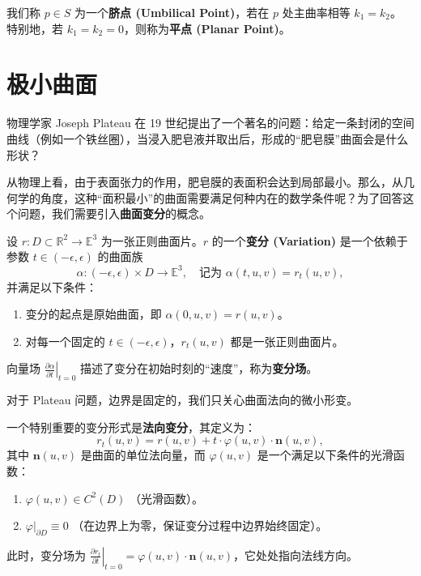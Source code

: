 \documentclass[lang=cn,10pt,thmcnt=section]{elegantbook}
\renewcommand{\vec}[1]{\mathbf{#1}}
\begin{document}
\begin{definition}[脐点]
    我们称 $p \in S$ 为一个\textbf{脐点 (Umbilical Point)}，若在 $p$ 处主曲率相等 $k_1 = k_2$。
    特别地，若 $k_1=k_2=0$，则称为\textbf{平点 (Planar Point)}。
\end{definition}


\section{极小曲面}
物理学家 Joseph Plateau 在 19 世纪提出了一个著名的问题：给定一条封闭的空间曲线（例如一个铁丝圈），当浸入肥皂液并取出后，形成的“肥皂膜”曲面会是什么形状？

从物理上看，由于表面张力的作用，肥皂膜的表面积会达到局部最小。那么，从几何学的角度，这种“面积最小”的曲面需要满足何种内在的数学条件呢？为了回答这个问题，我们需要引入\textbf{曲面变分}的概念。

\begin{definition}[曲面变分]
    设 $r: D \subset \mathbb{R}^2 \to \mathbb{E}^3$ 为一张正则曲面片。$r$ 的一个\textbf{变分 (Variation)} 是一个依赖于参数 $t \in (-\epsilon, \epsilon)$ 的曲面族
    \[
    \alpha: (-\epsilon, \epsilon) \times D \to \mathbb{E}^3, \quad \text{记为 } \alpha(t, u, v) = r_t(u, v),
    \]
    并满足以下条件：
    \begin{enumerate}
        \item 变分的起点是原始曲面，即 $\alpha(0, u, v) = r(u, v)$。
        \item 对每一个固定的 $t \in (-\epsilon, \epsilon)$，$r_t(u,v)$ 都是一张正则曲面片。
    \end{enumerate}
    向量场 $\left. \frac{\partial \alpha}{\partial t} \right|_{t=0}$ 描述了变分在初始时刻的“速度”，称为\textbf{变分场}。
\end{definition}

对于 Plateau 问题，边界是固定的，我们只关心曲面法向的微小形变。

\begin{definition}[法向变分]
    一个特别重要的变分形式是\textbf{法向变分}，其定义为：
    \[
    r_t(u, v) = r(u, v) + t \cdot \varphi(u, v) \cdot \vec{n}(u, v),
    \]
    其中 $\vec{n}(u,v)$ 是曲面的单位法向量，而 $\varphi(u,v)$ 是一个满足以下条件的光滑函数：
    \begin{enumerate}
        \item $\varphi(u, v) \in C^2(D)$ （光滑函数）。
        \item $\varphi \big|_{\partial D} \equiv 0$ （在边界上为零，保证变分过程中边界始终固定）。
    \end{enumerate}
    此时，变分场为 $\left. \frac{\partial r_t}{\partial t} \right|_{t=0} = \varphi(u, v) \cdot \vec{n}(u, v)$，它处处指向法线方向。
\end{definition}
\end{document}
